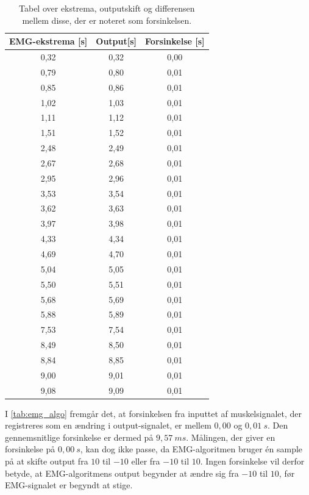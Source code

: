\begin{table}[H]
\centering
\begin{tabular}{|c|c|c|}
\hline 
\textbf{EMG-ekstrema [s]} & \textbf{Output[s]} & \textbf{Forsinkelse [s]}\\ 
\hline 
0,32 & 0,32 & 0,00\\ 
\hline 
0,79 & 0,80 & 0,01\\ 
\hline 
0,85 & 0,86 & 0,01\\ 
\hline 
1,02 & 1,03 & 0,01\\ 
\hline 
1,11 & 1,12 & 0,01\\ 
\hline 
1,51 & 1,52 & 0,01\\ 
\hline 
2,48 & 2,49 & 0,01\\ 
\hline 
2,67 & 2,68 & 0,01\\ 
\hline 
2,95 & 2,96 & 0,01\\ 
\hline 
3,53 & 3,54 & 0,01\\ 
\hline 
3,62 & 3,63 & 0,01\\ 
\hline 
3,97 & 3,98 & 0,01\\ 
\hline 
4,33 & 4,34 & 0,01\\ 
\hline 
4,69 & 4,70 & 0,01\\ 
\hline 
5,04 & 5,05 & 0,01\\ 
\hline 
5,50 & 5,51 & 0,01\\ 
\hline 
5,68 & 5,69 & 0,01\\ 
\hline 
5,88 & 5,89 & 0,01\\ 
\hline 
7,53 & 7,54 & 0,01\\ 
\hline 
8,49 & 8,50 & 0,01\\ 
\hline 
8,84 & 8,85 & 0,01\\ 
\hline 
9,00 & 9,01 & 0,01\\ 
\hline 
9,08 & 9,09 & 0,01\\ 
\hline 
\end{tabular} 
\caption{Tabel over ekstrema, outputskift og differensen mellem disse, der er noteret som forsinkelsen.}
\label{tab:emg_algo}
\end{table}

\noindent
I \autoref{tab:emg_algo} fremgår det, at forsinkelsen fra inputtet af muskelsignalet, der registreres som en ændring i output-signalet, er mellem $0,00$ og $0,01~s$. Den gennemsnitlige forsinkelse er dermed på $9,57~ms$. Målingen, der giver en forsinkelse på $0,00~s$, kan dog ikke passe, da EMG-algoritmen bruger én sample på at skifte output fra $10$ til $-10$ eller fra $-10$ til $10$. Ingen forsinkelse vil derfor betyde, at EMG-algoritmens output begynder at ændre sig fra $-10$ til $10$, før EMG-signalet er begyndt at stige. 

